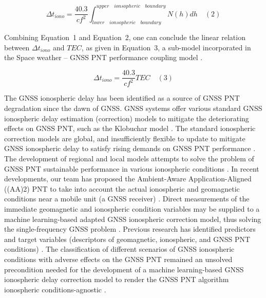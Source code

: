 \documentclass[sn-mathphys-num]{sn-jnl}%
\begin{document}
\begin{equation}
	\Delta t_{iono} = \frac{40.3}{c f^{2}} \int_{lower \quad ionsopheric \quad boundary}^{upper \quad ionsopheric \quad boundary}N(h)dh
	\quad\left(2\right)
\end{equation}

Combining Equation~1 and Equation~2, one can conclude the linear relation between $\Delta t_{iono}$ and $TEC$, as given in Equation~3, a sub-model incorporated in the Space weather – GNSS PNT performance coupling model \cite{filic2018modelling}.

\begin{equation}
	\Delta t_{iono} = \frac{40.3}{c f^{2}} TEC
	\quad\left(3\right)
\end{equation}

The GNSS ionospheric delay has been identified as a source of GNSS PNT degradation since the dawn of GNSS. GNSS systems offer various standard GNSS ionospheric delay estimation (correction) models to mitigate the deteriorating effects on GNSS PNT, such as the Klobuchar model \cite{spilker1996global, filic2018modelling}. The standard ionospheric correction models are global, and insufficiently flexible to update to mitigate GNSS ionospheric delay to satisfy rising demands on GNSS PNT performance \cite{filjar2024ambient, filic2018modelling}. The development of regional and local models attempts to solve the problem of GNSS PNT sustainable performance in various ionospheric conditions \cite{sikirica2021risk}. In recent developments, our team has proposed the Ambient-Aware Application-Aligned ((AA)2) PNT to take into account the actual ionospheric and geomagnetic conditions near a mobile unit (a GNSS receiver) \cite{filjar2022application, filic2018modelling, filjar2024ambient}. Direct measurements of the immediate geomagnetic and ionospheric condition variables may be supplied to a machine learning-based adapted GNSS ionospheric correction model, thus solving the single-frequency GNSS problem \cite{filjar2022application}. Previous research has identified predictors and target variables (descriptors of geomagnetic, ionospheric, and GNSS PNT conditions) \cite{filic2018modelling, natras2022ensemble, natras2023regional}. The classification of different scenarios of GNSS ionospheric conditions with adverse effects on the GNSS PNT remained an unsolved precondition needed for the development of a machine learning-based GNSS ionospheric delay correction model to render the GNSS PNT algorithm ionospheric conditions-agnostic \cite{filjar2022application, filjar2024ambient}.
\end{document}
